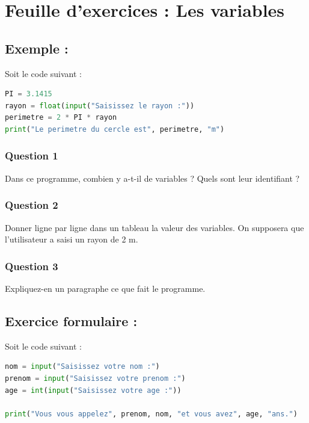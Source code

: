 \setcounter{Exercise}{0}

\chapter*{Feuille d'exercices : Les variables}

\section*{Exemple :}

Soit le code suivant :
\begin{lstlisting}[style=pythonstyle, language=Python]
PI = 3.1415
rayon = float(input("Saisissez le rayon :"))
perimetre = 2 * PI * rayon
print("Le perimetre du cercle est", perimetre, "m")  

\end{lstlisting}

\subsection*{Question 1}
Dans ce programme, combien y a-t-il de variables ? Quels sont leur identifiant ?

\subsection*{Question 2}
Donner ligne par ligne dans un tableau la valeur des variables.
On supposera que l'utilisateur a saisi un rayon de 2 m.\\

\subsection*{Question 3}
Expliquez-en un paragraphe ce que fait le programme.

\vfill

\section*{Exercice formulaire :}

Soit le code suivant :
\begin{lstlisting}[style=pythonstyle, language=Python]
nom = input("Saisissez votre nom :")
prenom = input("Saisissez votre prenom :")
age = int(input("Saisissez votre age :"))

print("Vous vous appelez", prenom, nom, "et vous avez", age, "ans.")  
\end{lstlisting}

